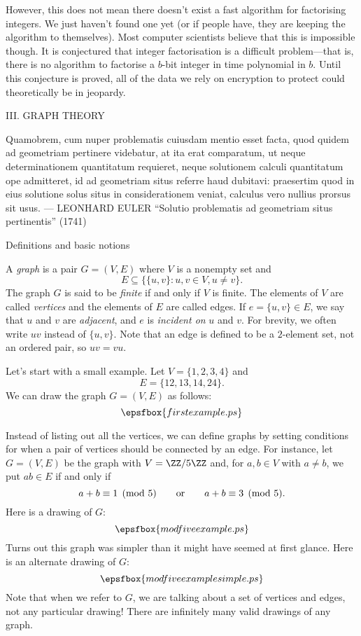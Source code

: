 However, this does not mean there doesn't exist a fast algorithm for factorising
integers. We just haven't found one yet (or if people have, they are keeping the algorithm
to themselves). Most computer scientists believe that this is impossible though. It
is conjectured
that integer factorisation is a difficult problem---that is, there is no algorithm to
factorise a $b$-bit integer in time polynomial in $b$. Until this conjecture is proved,
all of the data we rely on encryption to protect could theoretically be in jeopardy.

\vfill\eject
\begingroup\headline{\hfil}\footline{\hfil}
\centerline{\titlefont III. GRAPH THEORY}
\vskip220pt
\bigskip
\begingroup\obeylines\eightssi
\hfill Quamobrem, cum nuper problematis cuiusdam mentio esset facta,
\hfill quod quidem ad geometriam pertinere videbatur,
\hfill at ita erat comparatum, ut neque determinationem quantitatum requieret,
\hfill neque solutionem calculi quantitatum ope admitteret,
\hfill id ad geometriam situs referre haud dubitavi:
\hfill praesertim quod in eius solutione solus situs in considerationem veniat,
\hfill calculus vero nullius prorsus sit usus.
\eightss
\smallskip
\hfill --- LEONHARD EULER {\eightssi ``Solutio problematis ad geometriam situs pertinentis''} (1741)
\endgroup%
\bigskip\goodbreak
\vfill\eject

\advsect Definitions and basic notions

A {\it graph} is a pair $G = (V,E)$ where $V$ is a nonempty set and
$$E \subseteq \bigl\{ \{u,v\} : u,v\in V, u\ne v\bigr\}.$$
The graph $G$ is said to be {\it finite} if and only if $V$ is finite.
The elements of $V$ are called {\it vertices} and the elements of $E$ are
called edges.
If $e = \{u,v\}\in E$, we say that $u$ and $v$ are {\it adjacent}, and
$e$ is {\it incident on} $u$ and $v$. For brevity, we often write $uv$ instead
of $\{u,v\}$. Note that an edge is defined to be a $2$-element set, not an ordered
pair, so $uv = vu$.

Let's start with a small example. Let $V = \{1,2,3,4\}$ and
$$E = \{12, 13, 14, 24\}.$$
We can draw the graph $G = (V,E)$ as follows:
\midinsert
$$\epsfbox{firstexample.ps}$$
\endinsert
\goodbreak

Instead of listing out all the vertices,
we can define graphs by setting conditions for when a pair of vertices should
be connected by an edge.
For instance, let $G = (V,E)$
be the graph with $V = \ZZ/5\ZZ$ and, for $a,b\in V$ with $a\ne b$,
we put $ab\in E$ if and only if
$$a + b \equiv 1\pmod 5\qquad\hbox{or}\qquad a+b \equiv 3\pmod 5.$$
Here is a drawing of $G$:
\midinsert
$$\epsfbox{modfiveexample.ps}$$
\endinsert
\goodbreak
Turns out this graph was simpler than it might have seemed at first glance.
Here is an alternate drawing of $G$:
\midinsert
$$\epsfbox{modfiveexamplesimple.ps}$$
\endinsert
\goodbreak
Note that when we refer to $G$, we are talking
about a set of vertices and edges, not any particular drawing!
There are infinitely many valid drawings of any graph.

